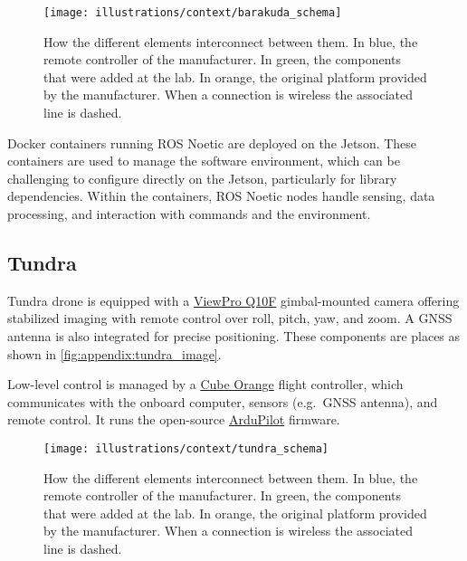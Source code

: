 \begin{figure}[ht!]
    \centering
    \texttt{[image: illustrations/context/barakuda\_schema]}
    \caption{How the different elements interconnect between them.
    In blue, the remote controller of the manufacturer.
    In green, the components that were added at the lab.
    In orange, the original platform provided by the manufacturer.
    When a connection is wireless the associated line is dashed.}
    \label{fig:context:barakuda_schematics}
\end{figure}

Docker containers running ROS Noetic are deployed on the Jetson.
These containers are used to manage the software environment, which can be challenging to configure directly on the Jetson, particularly for library dependencies.
Within the containers, ROS Noetic nodes handle sensing, data processing, and interaction with commands and the environment.

\subsection{Tundra}\label{subsec:tundra}

Tundra drone is equipped with a \href{https://www.viewprotech.com/index.php?ac=article&at=read&did=279}{ViewPro Q10F} gimbal-mounted camera
offering stabilized imaging with remote control over roll, pitch, yaw, and zoom.
A GNSS antenna is also integrated for precise positioning.
These components are places as shown in \cref{fig:appendix:tundra_image}.

Low-level control is managed by a \href{https://www.cubepilot.com/#/cube/features}{Cube Orange} flight controller,
which communicates with the onboard computer, sensors (e.g.\ GNSS antenna), and remote control.
It runs the open-source \href{https://github.com/ArduPilot/ardupilot}{ArduPilot} firmware.

\begin{figure}[ht!]
    \centering
    \texttt{[image: illustrations/context/tundra\_schema]}
    \caption{How the different elements interconnect between them.
    In blue, the remote controller of the manufacturer.
    In green, the components that were added at the lab.
    In orange, the original platform provided by the manufacturer.
    When a connection is wireless the associated line is dashed.}
    \label{fig:context:tundra_schematics}
\end{figure}

